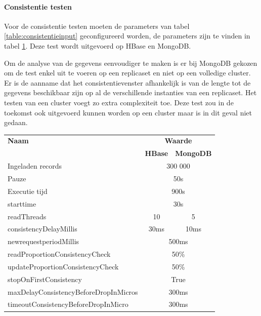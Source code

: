 \paragraph{Consistentie testen} Voor de consistentie testen moeten de parameters van tabel \ref{table:consistentieinput} geconfigureerd worden, de parameters zijn te vinden in tabel \ref{table:consistentie-testen-parameters}. Deze test wordt uitgevoerd op HBase en MongoDB. 

Om de analyse van de gegevens eenvoudiger te maken is er bij MongoDB gekozen om de test enkel uit te voeren op een replicaset en niet op een volledige cluster. Er is de aanname dat het consistentievenster afhankelijk is van de lengte tot de gegevens beschikbaar zijn op al de verschillende instanties van een replicaset. Het testen van een cluster voegt zo extra complexiteit toe. Deze test zou in de toekomst ook uitgevoerd kunnen worden op een cluster maar is in dit geval niet gedaan.  

\begin{table}[htb!]
	\centering
		\begin{tabular}{l|c c }
			\textbf{Naam} & \multicolumn{2}{c}{\textbf{Waarde}} \\ 
		 	 & \textbf{HBase} & \textbf{MongoDB} \\ \hline
			Ingeladen records  & \multicolumn{2}{c}{300 000} \\
			Pauze & \multicolumn{2}{c}{50s} \\
			Executie tijd & \multicolumn{2}{c}{900s} \\	
			starttime & \multicolumn{2}{c}{30s} \\
			readThreads & 10 & 5\\ 
			consistencyDelayMillis & 30ms & 10ms\\ 
			newrequestperiodMillis & \multicolumn{2}{c}{500ms} \\ 
			readProportionConsistencyCheck & \multicolumn{2}{c}{50\%} \\ 
			updateProportionConsistencyCheck & \multicolumn{2}{c}{50\%} \\ 
			stopOnFirstConsistency & \multicolumn{2}{c}{True} \\ 
			maxDelayConsistencyBeforeDropInMicros & \multicolumn{2}{c}{300ms} \\ 
			timeoutConsistencyBeforeDropInMicro & \multicolumn{2}{c}{300ms} \\
		\end{tabular} 
	\label{table:consistentie-testen-parameters}
\end{table}


